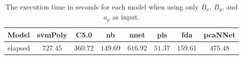 \begin{table}[!ht]
	\centering
	\begin{tabular}{|c|c|c|c|c|c|c|c|}
		\hline
		Model & svmPoly & C5.0 & nb & nnet & pls & fda & pcaNNet \\ \hline
		elapsed & $727.45$ & $360.72$ & $149.69$ & $616.92$ & $51.37$ & $159.61$ & $475.48$ \\ \hline
	\end{tabular}
	\caption{The execution time in seconds for each model when using only $B_{x}$, $B_{y}$, and $a_{p}$ as input.}
	\label{tab:time:reverse:xyap:total}
\end{table}
